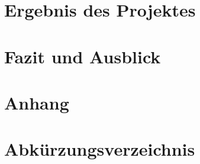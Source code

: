\documentclass[ngerman]{scrartcl} %
\begin{document}


\newpage

\section{Ergebnis des Projektes}        
\label{sec:Ergebnis des Projektes-1}  

\newpage

\section{Fazit und Ausblick}        
\label{sec:Fazit und Ausblick-1}  

\newpage

\section{Anhang}        
\label{sec:Anhang-1}  



\newpage

\section{Abkürzungsverzeichnis}
\label{sec:Abkürzungsverzeichnis}



\newpage


  


\newpage


\listoffigures

\newpage

\listoftables 
\end{document}
